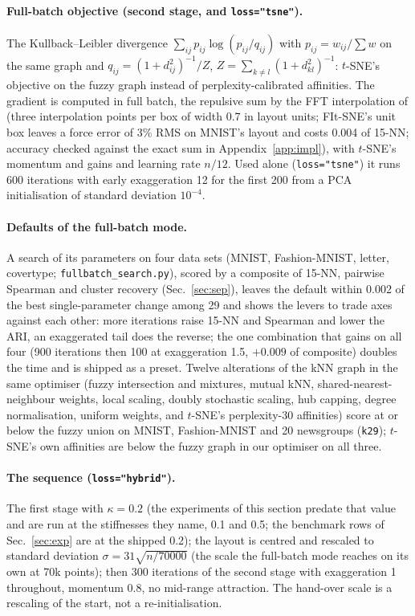 \documentclass[11pt]{article}
\begin{document}
\paragraph{Full-batch objective (second stage, and \texttt{loss="tsne"}).} The Kullback--Leibler
divergence $\sum_{ij} p_{ij} \log (p_{ij} / q_{ij})$ with $p_{ij} = w_{ij} / \sum w$ on the same graph
and $q_{ij} = (1 + d_{ij}^2)^{-1} / Z$, $Z = \sum_{k \ne l} (1 + d_{kl}^2)^{-1}$: $t$-SNE's objective on
the fuzzy graph instead of perplexity-calibrated affinities. The gradient is computed in full batch,
the repulsive sum by the FFT interpolation of \citet{linderman2019fitsne} (three interpolation points per
box of width 0.7 in layout units; FIt-SNE's unit box leaves a force error of 3\% RMS on MNIST's layout
and costs 0.004 of 15-NN; accuracy checked against the exact sum in Appendix~\ref{app:impl}),
with $t$-SNE's momentum and gains and learning rate $n / 12$. Used alone (\texttt{loss="tsne"}) it runs
600 iterations with early exaggeration 12 for the first 200 from a PCA initialisation of standard
deviation $10^{-4}$.

\paragraph{Defaults of the full-batch mode.} A search of its parameters on four data sets (MNIST, Fashion-MNIST,
letter, covertype; \texttt{fullbatch\_search.py}), scored by a composite of 15-NN, pairwise Spearman and
cluster recovery (Sec.~\ref{sec:sep}), leaves the default within 0.002 of the best single-parameter change
among 29 and shows the levers to trade axes against each other: more iterations raise 15-NN and Spearman and
lower the ARI, an exaggerated tail does the reverse; the one combination that gains on all four (900
iterations then 100 at exaggeration 1.5, $+0.009$ of composite) doubles the time and is shipped as a preset.
Twelve alterations of the kNN graph in the same optimiser (fuzzy intersection and mixtures, mutual kNN,
shared-nearest-neighbour weights, local scaling, doubly stochastic scaling, hub capping, degree
normalisation, uniform weights, and $t$-SNE's perplexity-30 affinities) score at or below the fuzzy union on
MNIST, Fashion-MNIST and 20 newsgroups (\texttt{k29}); $t$-SNE's own affinities are below the fuzzy graph in
our optimiser on all three.

\paragraph{The sequence (\texttt{loss="hybrid"}).} The first stage with $\kappa = 0.2$ (the experiments of
this section predate that value and are run at the stiffnesses they name, 0.1 and 0.5; the benchmark rows of
Sec.~\ref{sec:exp} are at the shipped 0.2); the layout is
centred and rescaled to standard deviation $\sigma = 31 \sqrt{n / 70000}$ (the scale the full-batch
mode reaches on its own at 70k points); then 300 iterations of the second stage with exaggeration 1
throughout, momentum 0.8, no mid-range attraction. The hand-over scale is a rescaling of the start, not
a re-initialisation.
\end{document}
